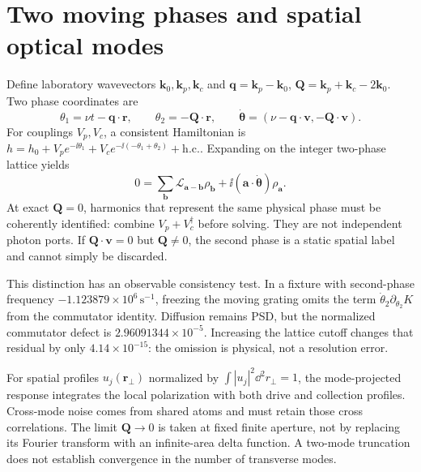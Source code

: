 \section{Two moving phases and spatial optical modes}
\label{sec:gc-kinetic}

Define laboratory wavevectors $\mathbf k_0,\mathbf k_p,\mathbf k_c$ and
$\mathbf q=\mathbf k_p-\mathbf k_0$,
$\mathbf Q=\mathbf k_p+\mathbf k_c-2\mathbf k_0$. Two phase coordinates are
\begin{equation}
 \theta_1=\nu t-\mathbf q\cdot\mathbf r,\qquad
 \theta_2=-\mathbf Q\cdot\mathbf r,\qquad
 \dot{\boldsymbol\theta}
 =(\nu-\mathbf q\cdot\mathbf v,-\mathbf Q\cdot\mathbf v).
 \label{eq:gc-moving-phases}
\end{equation}
For couplings $V_p,V_c$, a consistent Hamiltonian is
$h=h_0+V_pe^{-\ii\theta_1}+V_ce^{-\ii(-\theta_1+\theta_2)}+\mathrm{h.c.}$.
Expanding on the integer two-phase lattice yields
\begin{equation}
 0=\sum_{\mathbf b}\mathcal L_{\mathbf a-\mathbf b}\rho_{\mathbf b}
    +\ii(\mathbf a\cdot\dot{\boldsymbol\theta})\rho_{\mathbf a}.
 \label{eq:gc-kinetic-lattice}
\end{equation}
At exact $\mathbf Q=0$, harmonics that represent the same physical phase
must be coherently identified: combine $V_p+V_c^\dagger$ before solving.
They are not independent photon ports. If $\mathbf Q\cdot\mathbf v=0$
but $\mathbf Q\ne0$, the second phase is a static spatial label and cannot
simply be discarded.

This distinction has an observable consistency test. In a fixture with
second-phase frequency $-1.123879\times10^6\,\mathrm{s}^{-1}$, freezing the
moving grating omits the term $\dot\theta_2\partial_{\theta_2}K$ from the
commutator identity. Diffusion remains PSD, but the normalized commutator
defect is $2.96091344\times10^{-5}$. Increasing the lattice cutoff changes
that residual by only $4.14\times10^{-15}$: the omission is physical, not a
resolution error.

For spatial profiles $u_j(\mathbf r_\perp)$ normalized by
$\int |u_j|^2\dd^2r_\perp=1$, the mode-projected response integrates the
local polarization with both drive and collection profiles. Cross-mode noise
comes from shared atoms and must retain those cross correlations. The limit
$\mathbf Q\to0$ is taken at fixed finite aperture, not by replacing its
Fourier transform with an infinite-area delta function. A two-mode truncation
does not establish convergence in the number of transverse modes.

